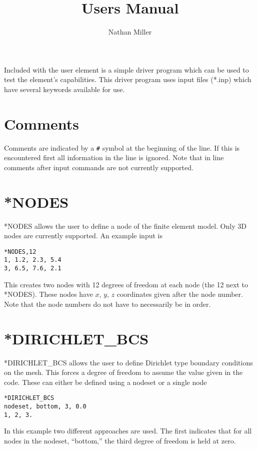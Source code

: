 \documentclass{asme2ej}
\begin{document}
\title{Users Manual}
\author{Nathan Miller}

\maketitle

Included with the user element is a simple driver program which can be used to test the element's capabilities. This driver program uses input files (*.inp) which have several keywords available for use.

\section{Comments}

Comments are indicated by a \verb|#| symbol at the beginning of the line. If this is encountered first all information in the line is ignored. Note that in line comments after input commands are not currently supported.

\section{*NODES}

*NODES allows the user to define a node of the finite element model. Only 3D nodes are currently supported. An example input is

\begin{verbatim}
*NODES,12
1, 1.2, 2.3, 5.4
3, 6.5, 7.6, 2.1
\end{verbatim}

This creates two nodes with 12 degrees of freedom at each node (the 12 next to *NODES). These nodes have $x$, $y$, $z$ coordinates given after the node number. Note that the node numbers do not have to necessarily be in order.

\section{*DIRICHLET\_BCS}

*DIRICHLET\_BCS allows the user to define Dirichlet type boundary conditions on the mesh. This forces a degree of freedom to assume the value given in the code. These can either be defined using a nodeset or a single node

\begin{verbatim}
*DIRICHLET_BCS
nodeset, bottom, 3, 0.0
1, 2, 3.
\end{verbatim}

In this example two different approaches are used. The first indicates that for all nodes in the nodeset, ``bottom,'' the third degree of freedom is held at zero.
\end{document}
